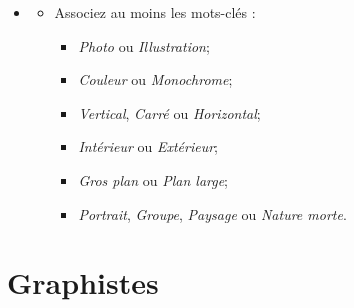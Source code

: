 \documentclass[12pt,nofoldmark,notumble]{leaflet}
\begin{document}
\begin{center}
  \setlength{\fboxsep}{0pt}%
  \setlength{\fboxrule}{0pt}%
\end{center}

\vspace*{\fill}

\begin{itemize}
  \item[]
  \begin{itemize}
  \item Associez au moins les mots-clés :

    \begin{itemize}
    \item \emph{Photo} ou \emph{Illustration};
    \item \emph{Couleur} ou \emph{Monochrome};
    \item \emph{Vertical}, \emph{Carré} ou \emph{Horizontal};
    \item \emph{Intérieur} ou \emph{Extérieur};
    \item \emph{Gros plan} ou \emph{Plan large};
    \item \emph{Portrait}, \emph{Groupe}, \emph{Paysage} ou \emph{Nature morte}.
    \end{itemize}
  \end{itemize}
\end{itemize}
\vspace*{\fill}
\clearpage

\section{\faPaintBrush Graphistes}
\end{document}
